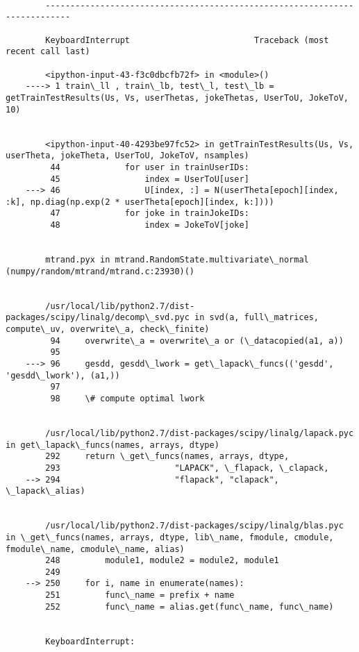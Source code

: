 \documentclass{article}
\begin{document}
    \begin{Verbatim}[commandchars=\\\{\}]

        ---------------------------------------------------------------------------

        KeyboardInterrupt                         Traceback (most recent call last)

        <ipython-input-43-f3c0dbcfb72f> in <module>()
    ----> 1 train\_ll , train\_lb, test\_l, test\_lb = getTrainTestResults(Us, Vs, userThetas, jokeThetas, UserToU, JokeToV, 10)
    

        <ipython-input-40-4293be97fc52> in getTrainTestResults(Us, Vs, userTheta, jokeTheta, UserToU, JokeToV, nsamples)
         44             for user in trainUserIDs:
         45                 index = UserToU[user]
    ---> 46                 U[index, :] = N(userTheta[epoch][index, :k], np.diag(np.exp(2 * userTheta[epoch][index, k:])))
         47             for joke in trainJokeIDs:
         48                 index = JokeToV[joke]


        mtrand.pyx in mtrand.RandomState.multivariate\_normal (numpy/random/mtrand/mtrand.c:23930)()


        /usr/local/lib/python2.7/dist-packages/scipy/linalg/decomp\_svd.pyc in svd(a, full\_matrices, compute\_uv, overwrite\_a, check\_finite)
         94     overwrite\_a = overwrite\_a or (\_datacopied(a1, a))
         95 
    ---> 96     gesdd, gesdd\_lwork = get\_lapack\_funcs(('gesdd', 'gesdd\_lwork'), (a1,))
         97 
         98     \# compute optimal lwork


        /usr/local/lib/python2.7/dist-packages/scipy/linalg/lapack.pyc in get\_lapack\_funcs(names, arrays, dtype)
        292     return \_get\_funcs(names, arrays, dtype,
        293                       "LAPACK", \_flapack, \_clapack,
    --> 294                       "flapack", "clapack", \_lapack\_alias)
    

        /usr/local/lib/python2.7/dist-packages/scipy/linalg/blas.pyc in \_get\_funcs(names, arrays, dtype, lib\_name, fmodule, cmodule, fmodule\_name, cmodule\_name, alias)
        248         module1, module2 = module2, module1
        249 
    --> 250     for i, name in enumerate(names):
        251         func\_name = prefix + name
        252         func\_name = alias.get(func\_name, func\_name)


        KeyboardInterrupt: 

    \end{Verbatim}
\end{document}
